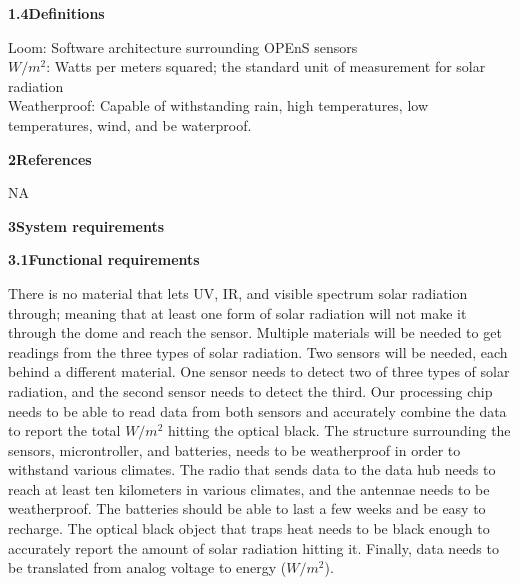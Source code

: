 \documentclass[10pt,draftclsnofoot,onecolumn,letterpaper]{article}
\begin{document}
{\fontsize{10pt}{12.0pt} \textbf{1.4\quad Definitions}\\\selectfont 
\par}\par
{\fontsize{10pt}{12.0pt} Loom: Software architecture surrounding OPEnS sensors\\$W/m^2$: Watts per meters squared; the standard unit of measurement for solar radiation\\Weatherproof: Capable of withstanding rain, high temperatures, low temperatures, wind, and be waterproof.\\ \selectfont
\par}\par

{\fontsize{12pt}{12.0pt} \textbf{2\quad References}\\\selectfont 
\par}\par
{\fontsize{10pt}{12.0pt} NA\\\selectfont 
\par}\par

{\fontsize{12pt}{12.0pt} \textbf{3\quad System requirements}\\\selectfont 
\par}\par

{\fontsize{10pt}{12.0pt} \textbf{3.1\quad Functional requirements}\\\selectfont 
\par}\par
{\fontsize{10pt}{12.0pt} There is no material that lets UV, IR, and visible spectrum solar radiation through; meaning that at least one form of solar radiation will not make it through the dome and reach the sensor. Multiple materials will be needed to get readings from the three types of solar radiation. Two sensors will be needed, each behind a different material. One sensor needs to detect two of three types of solar radiation, and the second sensor needs to detect the third. Our processing chip needs to be able to read data from both sensors and accurately combine the data to report the total $W/m^2$ hitting the optical black. The structure surrounding the sensors, microntroller, and batteries, needs to be weatherproof in order to withstand various climates. The radio that sends data to the data hub needs to reach at least ten kilometers in various climates, and the antennae needs to be weatherproof. The batteries should be able to last a few weeks and be easy to recharge. The optical black object that traps heat needs to be black enough to accurately report the amount of solar radiation hitting it. Finally, data needs to be translated from analog voltage to energy ($W/m^2$).\\\selectfont 
\par}\par
\end{document}
